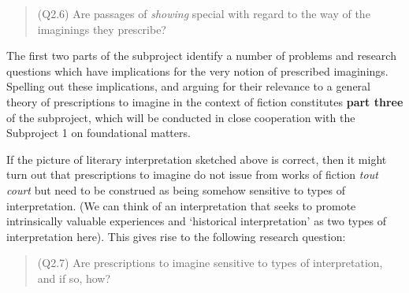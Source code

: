 \vspace{-.2cm}
\begin{quote}
(Q2.6) Are passages of \emph{showing} special with regard to the way of the imaginings they prescribe?
\end{quote}
\vspace{-.2cm}

\noindent The first two parts of the subproject identify a number of problems and research questions which have implications for the very notion of prescribed imaginings. Spelling out these implications, and arguing for their relevance to a general theory of prescriptions to imagine in the context of fiction constitutes \textbf{part three} of the subproject, which will be conducted in close cooperation with the Subproject 1 on foundational matters.

If the picture of literary interpretation sketched above is correct, then it might turn out that prescriptions to imagine do not issue from works of fiction \emph{tout court} but need to be construed as being somehow sensitive to types of interpretation. (We can think of an interpretation that seeks to promote intrinsically valuable experiences and `historical interpretation' as two types of interpretation here). This gives rise to the following research question:

\vspace{-.2cm}
\begin{quote}
(Q2.7)  Are prescriptions to imagine sensitive to types of interpretation, and if so, how?
\end{quote}
\vspace{-.2cm}

